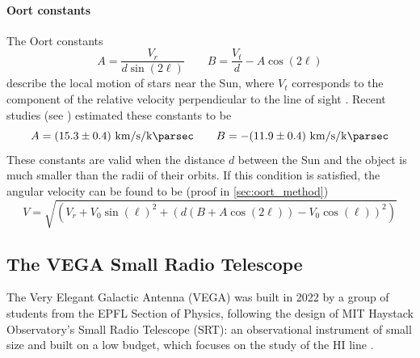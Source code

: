 \paragraph{Oort constants} The Oort constants
\begin{equation}
    A = \frac{V_r}{d \sin(2\ell)} \qquad B = \frac{V_t}{d} - A \cos(2\ell)
\end{equation}
describe the local motion of stars near the Sun, where $V_t$ corresponds to the component of the relative velocity perpendicular to the line of sight \cite{carroll_introduction_2007}. Recent studies (see \cite{bovy_galactic_2017}) estimated these constants to be
\begin{equation*}
    A = (15.3 \pm 0.4) \ \si{\kilo\meter\per\second\per\kilo\parsec} \qquad B = -(11.9 \pm 0.4) \ \si{\kilo\meter\per\second\per\kilo\parsec}
\end{equation*}
These constants are valid when the distance $d$ between the Sun and the object is much smaller than the radii of their orbits. If this condition is satisfied, the angular velocity can be found to be (proof in \autoref{sec:oort_method})
\begin{equation*}
    V = \sqrt{(V_r + V_0 \sin(\ell)^2 + (d(B + A\cos(2\ell)) - V_0 \cos(\ell))^2)}
\end{equation*}

\subsection{The VEGA Small Radio Telescope}
The Very Elegant Galactic Antenna (VEGA) was built in 2022 by a group of students from the EPFL Section of Physics, following the design of MIT Haystack Observatory's Small Radio Telescope (SRT): an observational instrument of small size and built on a low budget, which focuses on the study of the HI line \cite{interdisciplinary_project_2022}.

